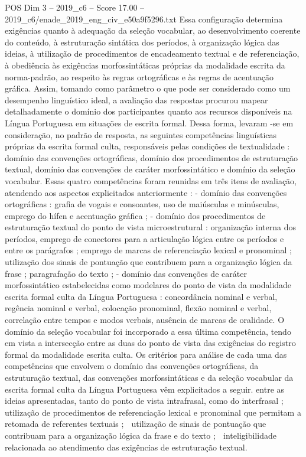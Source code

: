 \begin{textsample}{POS Dim 3 – 2019\_c6 – Score 17.00 – 2019\_c6/enade\_2019\_eng\_civ\_e50a9f5296.txt}
Essa configuração determina exigências quanto à adequação da seleção vocabular, ao desenvolvimento coerente do conteúdo, à estruturação sintática dos períodos, à organização lógica das ideias, à utilização de procedimentos de encadeamento textual e de referenciação, à obediência às exigências morfossintáticas próprias da modalidade escrita da norma-padrão, ao respeito às regras ortográficas e às regras de acentuação gráfica.
Assim, tomando como parâmetro o que pode ser considerado como um desempenho linguístico ideal, a avaliação das respostas procurou mapear detalhadamente o domínio dos participantes quanto aos recursos disponíveis na Língua Portuguesa em situações de escrita formal.
Dessa forma, levaram -se em consideração, no padrão de resposta, as seguintes competências linguísticas próprias da escrita formal culta, responsáveis pelas condições de textualidade : domínio das convenções ortográficas, domínio dos procedimentos de estruturação textual, domínio das convenções de caráter morfossintático e domínio da seleção vocabular.
Essas quatro competências foram reunidas em três itens de avaliação, atendendo aos aspectos explicitados anteriormente : - domínio das convenções ortográficas : grafia de vogais e consoantes, uso de maiúsculas e minúsculas, emprego do hífen e acentuação gráfica ; - domínio dos procedimentos de estruturação textual do ponto de vista microestrutural : organização interna dos períodos, emprego de conectores para a articulação lógica entre os períodos e entre os parágrafos ; emprego de marcas de referenciação lexical e pronominal ; utilização dos sinais de pontuação que contribuem para a organização lógica da frase ; paragrafação do texto ; - domínio das convenções de caráter morfossintático estabelecidas como modelares do ponto de vista da modalidade escrita formal culta da Língua Portuguesa : concordância nominal e verbal, regência nominal e verbal, colocação pronominal, flexão nominal e verbal, correlação entre tempos e modos verbais, ausência de marcas de oralidade.
O domínio da seleção vocabular foi incorporado a essa última competência, tendo em vista a intersecção entre as duas do ponto de vista das exigências do registro formal da modalidade escrita culta.
Os critérios para análise de cada uma das competências que envolvem o domínio das convenções ortográficas, da estruturação textual, das convenções morfossintáticas e da seleção vocabular da escrita formal culta da Língua Portuguesa vêm explicitados a seguir. entre as ideias apresentadas, tanto do ponto de vista intrafrasal, como do interfrasal ;  utilização de procedimentos de referenciação lexical e pronominal que permitam a retomada de referentes textuais ;  utilização de sinais de pontuação que contribuam para a organização lógica da frase e do texto ;  inteligibilidade relacionada ao atendimento das exigências de estruturação textual.

\end{textsample}
